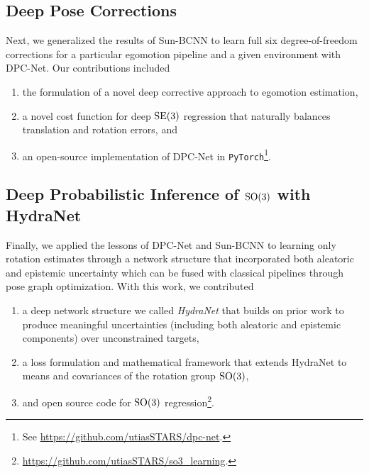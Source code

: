 

\subsection{Deep Pose Corrections}

Next, we generalized the results of Sun-BCNN to learn full six degree-of-freedom corrections for a particular egomotion pipeline and a given environment with DPC-Net. Our contributions included

\begin{enumerate}
	\item the formulation of a novel deep corrective approach to egomotion estimation,
	\item a novel cost function for deep $\mathrm{SE}(3)$ regression that naturally balances translation and rotation errors, and
	\item an open-source implementation of DPC-Net in \texttt{PyTorch}\footnote{See \url{https://github.com/utiasSTARS/dpc-net}.}.
\end{enumerate}



\subsection{Deep Probabilistic Inference of $\mathrm{SO}(3)$ with HydraNet}


Finally, we applied the lessons of DPC-Net and Sun-BCNN to learning only rotation estimates through a network structure that incorporated both aleatoric and epistemic uncertainty which can be fused with classical pipelines through pose graph optimization. With this work, we contributed
\begin{enumerate}
\item a deep network structure we called \textit{HydraNet} that builds on prior work to produce meaningful uncertainties (including both aleatoric and epistemic components) over unconstrained targets,
\item a loss formulation and mathematical framework that extends HydraNet to means and covariances of the rotation group $\mathrm{SO}(3)$,
\item and open source code for $\mathrm{SO}(3)$ regression\footnote{\url{https://github.com/utiasSTARS/so3_learning}.}.
\end{enumerate}

